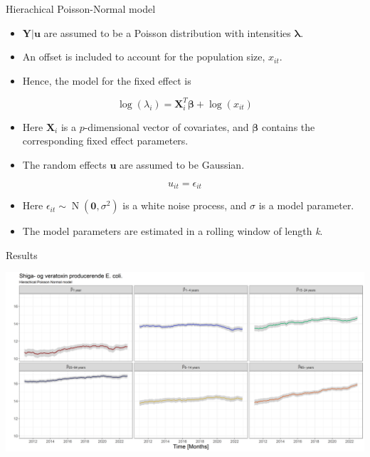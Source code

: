 \documentclass[aspectratio=169]{beamer}
\DeclareMathOperator{\N}{N}
\begin{document}
\begin{frame}{Hierachical Poisson-Normal model}
\protect\hypertarget{hierachical-poisson-normal-model-1}{}
\begin{itemize}
  \item $\boldsymbol{Y|u}$ are assumed to be a Poisson distribution with intensities $\boldsymbol{\lambda}$.
  \item An offset is included to account for the population size, $x_{it}$.
  \item Hence, the model for the fixed effect is
\end{itemize}

\begin{equation}
  \log(\lambda_{i})=\boldsymbol{X}_i^T\boldsymbol{\beta}+\log(x_{it})
\end{equation}

\begin{itemize}
  \item Here $\boldsymbol{X}_i$ is a $p$-dimensional vector of covariates, and $\boldsymbol{\beta}$ contains the corresponding fixed effect parameters.
  \item The random effects $\boldsymbol{u}$ are assumed to be Gaussian.
\end{itemize}

\begin{equation}
  u_{it} = \epsilon_{it}
\end{equation}

\begin{itemize}
  \item Here $\epsilon_{it}\sim\N(\boldsymbol{0},\sigma^2)$ is a white noise process, and $\sigma$ is a model parameter.
  \item The model parameters are estimated in a rolling window of length \textit{k}.
\end{itemize}
\end{frame}

\begin{frame}{Results}
\protect\hypertarget{results}{}
\tiny

\includegraphics[width=1\linewidth]{../figures/thetaSTECPoisNExclude}

\normalsize
\end{frame}
\end{document}
